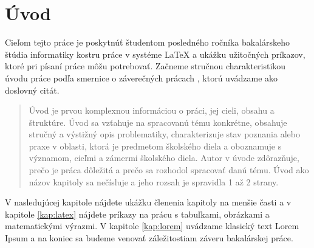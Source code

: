 \chapter*{Úvod}

Cieľom tejto práce je poskytnúť študentom posledného ročníka
bakalárskeho štúdia informatiky kostru práce v systéme LaTeX a ukážku
užitočných príkazov, ktoré pri písaní práce môžu potrebovať. Začneme
stručnou charakteristikou úvodu práce podľa smernice o záverečných
prácach \cite{smernica}, ktorú uvádzame ako doslovný citát.

\begin{quote}
Úvod je prvou komplexnou informáciou o práci, jej cieli, obsahu a štruktúre. Úvod sa 
vzťahuje na spracovanú tému konkrétne, obsahuje stručný a výstižný opis 
problematiky, charakterizuje stav poznania alebo praxe v oblasti, ktorá je predmetom 
školského diela a oboznamuje s významom, cieľmi a zámermi školského diela. Autor 
v úvode zdôrazňuje, prečo je práca dôležitá a prečo sa rozhodol spracovať danú tému. 
Úvod ako názov kapitoly sa nečísluje a jeho rozsah je spravidla 1 až 2 strany.
\end{quote}

V nasledujúcej kapitole nájdete ukážku členenia kapitoly na menšie
časti a v kapitole \ref{kap:latex} nájdete príkazy na prácu s
tabuľkami, obrázkami a matematickými výrazmi. V kapitole
\ref{kap:lorem} uvádzame klasický text Lorem Ipsum a na koniec sa
budeme venovať záležitostiam záveru bakalárskej práce. 
